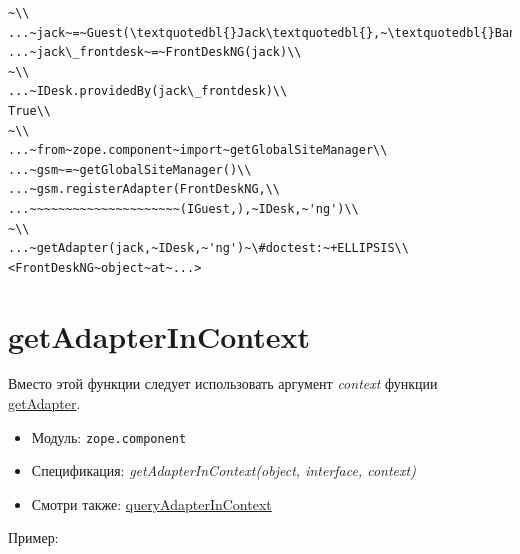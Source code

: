 \documentclass[a4paper,openany,twoside,draft]{book}
\providecommand*{\DUroletitlereference}[1]{\textsl{#1}}
\begin{document}
\begin{verbatim}
~\\
...~jack~=~Guest(\textquotedbl{}Jack\textquotedbl{},~\textquotedbl{}Bangalore\textquotedbl{})\\
...~jack\_frontdesk~=~FrontDeskNG(jack)\\
~\\
...~IDesk.providedBy(jack\_frontdesk)\\
True\\
~\\
...~from~zope.component~import~getGlobalSiteManager\\
...~gsm~=~getGlobalSiteManager()\\
...~gsm.registerAdapter(FrontDeskNG,\\
...~~~~~~~~~~~~~~~~~~~~~(IGuest,),~IDesk,~'ng')\\
~\\
...~getAdapter(jack,~IDesk,~'ng')~\#doctest:~+ELLIPSIS\\
<FrontDeskNG~object~at~...>
\end{verbatim}


\section*{getAdapterInContext%
  \label{getadapterincontext}%
}

Вместо этой функции следует использовать аргумент \DUroletitlereference{context} функции \hyperref[getadapter]{getAdapter}.

\begin{itemize}

\item Модуль: \texttt{zope.component}

\item Спецификация: \DUroletitlereference{getAdapterInContext(object, interface, context)}

\item Смотри также: \hyperref[queryadapterincontext]{queryAdapterInContext}

\end{itemize}

Пример:
\end{document}
